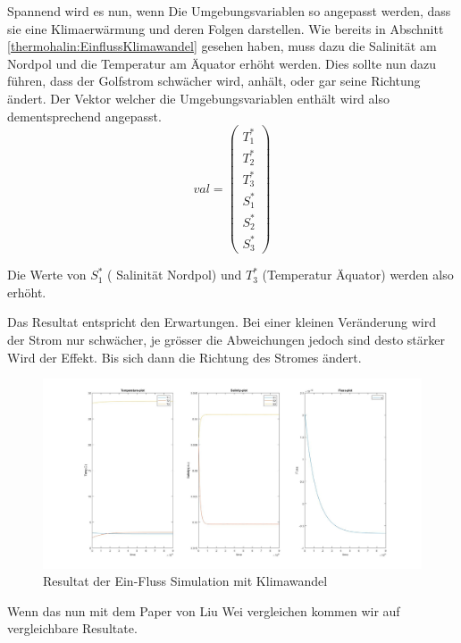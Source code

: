Spannend wird es nun, wenn Die Umgebungsvariablen so angepasst werden, dass sie eine Klimaerwärmung und deren Folgen darstellen. Wie bereits in Abschnitt \ref{thermohalin:EinflussKlimawandel} gesehen haben, muss dazu die Salinität am Nordpol und die Temperatur am Äquator erhöht werden. Dies sollte nun dazu führen, dass der Golfstrom schwächer wird, anhält, oder gar seine Richtung ändert. 
Der Vektor welcher die Umgebungsvariablen enthält wird also dementsprechend angepasst.
\begin{equation*}
val = \begin{pmatrix}T_{1}^{*} \\ T_{2}^{*} \\ T_{3}^{*} \\ S_{1}^{*} \\ S_{2}^{*} \\ S_{3}^{*}\end{pmatrix}
\end{equation*}

Die Werte von $S_1^*$ ( Salinität Nordpol) und $T_3^*$ (Temperatur Äquator) werden also erhöht.

Das Resultat entspricht den Erwartungen. Bei einer kleinen Veränderung wird der Strom nur schwächer, je grösser die Abweichungen jedoch sind desto stärker Wird der Effekt.
Bis sich dann die Richtung des Stromes ändert.

\begin{figure}
	\centering
	\includegraphics[width=14cm]{thermohalin/Code/graphs/3b1f-skript-klimawandel.jpg}
	\caption{Resultat der Ein-Fluss Simulation mit Klimawandel}
	\label{thermohalin:3b1f-skript-klimawandel}
\end{figure}

Wenn das nun mit dem Paper von Liu Wei \cite{thermohalin:liuwei} vergleichen kommen wir auf vergleichbare Resultate.


